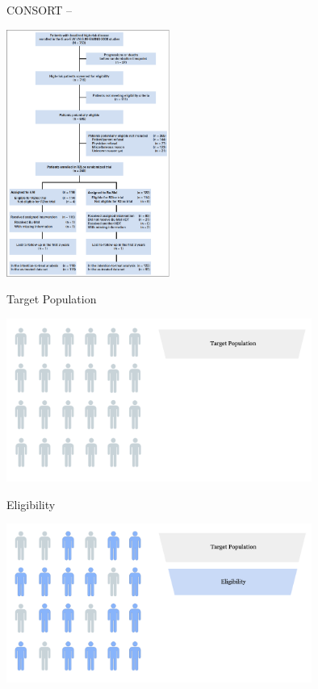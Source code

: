 \documentclass[english]{beamer}\usepackage[]{graphicx}\usepackage[]{xcolor}
\begin{document}
\begin{frame}{CONSORT -- \cite{whelan2018high}}
\begin{center}
\includegraphics[width=0.4\textwidth]{whelan_flow.png}
\end{center}
\end{frame}

\begin{frame}{Target Population}

\includegraphics[width=100mm,scale=1]{targetpop.png}

\end{frame}

\begin{frame}{Eligibility}

\includegraphics[width=100mm,scale=1]{eligibility.png}

\end{frame}
\end{document}

